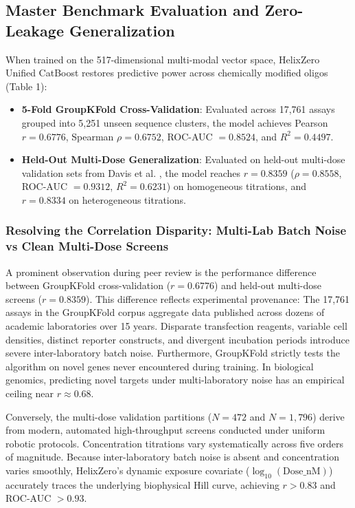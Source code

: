 \documentclass[twocolumn]{article}
\begin{document}
\subsection{Master Benchmark Evaluation and Zero-Leakage Generalization}
When trained on the 517-dimensional multi-modal vector space, HelixZero Unified CatBoost restores predictive power across chemically modified oligos (Table 1):
\begin{itemize}
    \item \textbf{5-Fold GroupKFold Cross-Validation}: Evaluated across 17,761 assays grouped into 5,251 unseen sequence clusters, the model achieves Pearson $r = 0.6776$, Spearman $\rho = 0.6752$, ROC-AUC $= 0.8524$, and $R^2 = 0.4497$.
    \item \textbf{Held-Out Multi-Dose Generalization}: Evaluated on held-out multi-dose validation sets from Davis et al. \cite{davis2025nar}, the model reaches $r = 0.8359$ ($\rho = 0.8558$, ROC-AUC $= 0.9312$, $R^2 = 0.6231$) on homogeneous titrations, and $r = 0.8334$ on heterogeneous titrations.
\end{itemize}

\subsubsection{Resolving the Correlation Disparity: Multi-Lab Batch Noise vs Clean Multi-Dose Screens}
A prominent observation during peer review is the performance difference between GroupKFold cross-validation ($r = 0.6776$) and held-out multi-dose screens ($r = 0.8359$). This difference reflects experimental provenance:
The 17,761 assays in the GroupKFold corpus aggregate data published across dozens of academic laboratories over 15 years. Disparate transfection reagents, variable cell densities, distinct reporter constructs, and divergent incubation periods introduce severe inter-laboratory batch noise. Furthermore, GroupKFold strictly tests the algorithm on novel genes never encountered during training. In biological genomics, predicting novel targets under multi-laboratory noise has an empirical ceiling near $r \approx 0.68$.

Conversely, the multi-dose validation partitions ($N = 472$ and $N = 1{,}796$) derive from modern, automated high-throughput screens \cite{davis2025nar} conducted under uniform robotic protocols. Concentration titrations vary systematically across five orders of magnitude. Because inter-laboratory batch noise is absent and concentration varies smoothly, HelixZero's dynamic exposure covariate ($\log_{10}(\text{Dose\_nM})$) accurately traces the underlying biophysical Hill curve, achieving $r > 0.83$ and ROC-AUC $> 0.93$.
\end{document}
